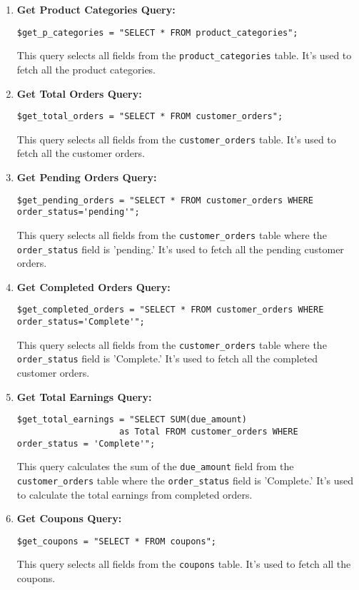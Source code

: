 \documentclass{article}
\begin{document}
\begin{enumerate}
    \item \textbf{Get Product Categories Query:}
    \begin{verbatim}
$get_p_categories = "SELECT * FROM product_categories";
    \end{verbatim}
    This query selects all fields from the \texttt{product\_categories} table. It's used to fetch all the product categories.
    
    \item \textbf{Get Total Orders Query:}
    \begin{verbatim}
$get_total_orders = "SELECT * FROM customer_orders";
    \end{verbatim}
    This query selects all fields from the \texttt{customer\_orders} table. It's used to fetch all the customer orders.
    
    \item \textbf{Get Pending Orders Query:}
    \begin{verbatim}
$get_pending_orders = "SELECT * FROM customer_orders WHERE order_status='pending'";
    \end{verbatim}
    This query selects all fields from the \texttt{customer\_orders} table where the \texttt{order\_status} field is 'pending.' It's used to fetch all the pending customer orders.
    
    \item \textbf{Get Completed Orders Query:}
    \begin{verbatim}
$get_completed_orders = "SELECT * FROM customer_orders WHERE order_status='Complete'";
    \end{verbatim}
    This query selects all fields from the \texttt{customer\_orders} table where the \texttt{order\_status} field is 'Complete.' It's used to fetch all the completed customer orders.
    
    \item \textbf{Get Total Earnings Query:}
    \begin{verbatim}
$get_total_earnings = "SELECT SUM(due_amount)
                    as Total FROM customer_orders WHERE order_status = 'Complete'";
    \end{verbatim}
    This query calculates the sum of the \texttt{due\_amount} field from the \texttt{customer\_orders} table where the \texttt{order\_status} field is 'Complete.' It's used to calculate the total earnings from completed orders.
    
    \item \textbf{Get Coupons Query:}
    \begin{verbatim}
$get_coupons = "SELECT * FROM coupons";
    \end{verbatim}
    This query selects all fields from the \texttt{coupons} table. It's used to fetch all the coupons.
\end{enumerate}
\end{document}
